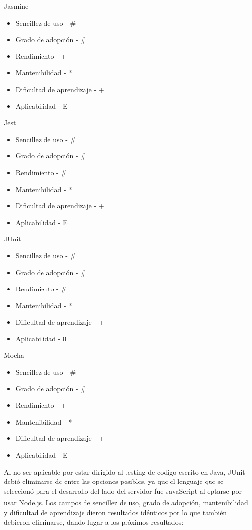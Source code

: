 \documentclass{article}
\begin{document}
Jasmine
\begin{itemize}
    \item Sencillez de uso - \#
    \item Grado de adopción - \#
    \item Rendimiento - +
    \item Mantenibilidad - *
    \item Dificultad de aprendizaje - +
    \item Aplicabilidad - E
\end{itemize}
Jest
\begin{itemize}
    \item Sencillez de uso - \#
    \item Grado de adopción - \#
    \item Rendimiento - \#
    \item Mantenibilidad - *
    \item Dificultad de aprendizaje - +
    \item Aplicabilidad - E 
\end{itemize}
JUnit
\begin{itemize}
    \item Sencillez de uso - \#
    \item Grado de adopción - \#
    \item Rendimiento - \#
    \item Mantenibilidad - *
    \item Dificultad de aprendizaje - +
    \item Aplicabilidad - 0
\end{itemize}
Mocha
\begin{itemize}
    \item Sencillez de uso - \#
    \item Grado de adopción - \#
    \item Rendimiento - +
    \item Mantenibilidad - *
    \item Dificultad de aprendizaje - +
    \item Aplicabilidad - E
\end{itemize}
Al no ser aplicable por estar dirigido al testing de codigo escrito en Java, JUnit debió eliminarse de entre las opciones posibles, ya que el lenguaje que se seleccionó para el desarrollo del lado del servidor fue JavaScript al optarse por usar Node.js\textsuperscript{\textregistered}. Los campos de sencillez de uso, grado de adopción, mantenibilidad y dificultad de aprendizaje dieron resultados idénticos por lo que también debieron eliminarse, dando lugar a los próximos resultados:
\end{document}
